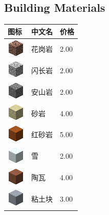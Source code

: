 \documentclass[UTF8]{ctexart}
\begin{document}
\subsection{Building Materials}
\begin{longtable}[]{|p{1cm}|p{8cm}|p{1.5cm}|}
\toprule
图标 & 中文名 & 价格\\
\midrule
	\includegraphics{.workspace/icons/minecraft/minecraft__stone__1.png} & 花岗岩 &2.00\\
	\hline
	\includegraphics{.workspace/icons/minecraft/minecraft__stone__3.png} & 闪长岩 &2.00\\
	\hline
	\includegraphics{.workspace/icons/minecraft/minecraft__stone__5.png} & 安山岩 &2.00\\
	\hline
	\includegraphics{.workspace/icons/minecraft/minecraft__sandstone__0.png} & 砂岩 &4.00\\
	\hline
	\includegraphics{.workspace/icons/minecraft/minecraft__red_sandstone__0.png} & 红砂岩 &5.00\\
	\hline
	\includegraphics{.workspace/icons/minecraft/minecraft__snow__0.png} & 雪 &2.00\\
	\hline
	\includegraphics{.workspace/icons/minecraft/minecraft__hardened_clay__0.png} & 陶瓦 &4.00\\
	\hline
	\includegraphics{.workspace/icons/minecraft/minecraft__clay__0.png} & 粘土块 &3.00\\

\end{longtable}
\end{document}
